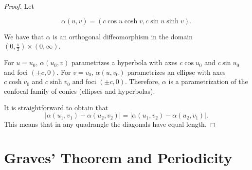 \begin{proof} Let 

\[\alpha(u,v)=(c\cos u\cosh v, c\sin u\sinh v).\]

We have that $\alpha$ is an orthogonal  diffeomorphism in the domain $(0,\frac{\pi}{2})\times (0,\infty)$.

For $u=u_0$, $\alpha(u_0,v)$ parametrizes a  hyperbola with axes $c\cos u_0$ and $ c\sin u_0$ and foci $(\pm c,0)$.
For $v=v_0$, $\alpha(u ,v_0)$ parametrizes an ellipse with axes $c\cosh{ v_0}$ and $c\sinh{ v_0}$ and foci $(\pm c,0)$. Therefore, $\alpha$ is a parametrization  of the  confocal family of conics (ellipses and hyperbolas).

It is straightforward to obtain that
\[ 
|\alpha(u_1,v_1)-\alpha(u_2,v_2)|=|\alpha(u_1,v_2)-\alpha(u_2,v_1)|.\]
This means that in any quadrangle the diagonals have equal length.
\end{proof}



\section{Graves' Theorem and Periodicity}


